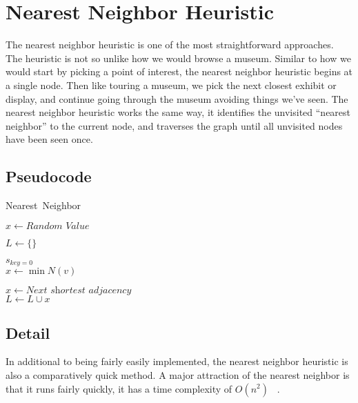 \documentclass{article}
\begin{document}
\section{Nearest Neighbor Heuristic}

The nearest neighbor heuristic is one of the most straightforward approaches.
The heuristic is not so unlike how we would browse a museum. Similar to how we
would start by picking a point of interest, the nearest neighbor heuristic
begins at a single node. Then like touring a museum, we pick the next closest
exhibit or display, and continue going through the museum avoiding things we’ve
seen. The nearest neighbor heuristic works the same way, it identifies the
unvisited “nearest neighbor” to the current node, and traverses the graph until
all unvisited nodes have been seen once.

\subsection{Pseudocode}

\FloatBarrier

\begin{algorithm}
  \caption{Nearest\ Neighbor}
  \label{alg1}
  \begin{algorithmic}[1]

    \State $x \gets \textit{Random\ Value}$

    \State $L \gets \{\}$

    \State $s_{\textit{key} = 0}$
    \\
        \State $x \gets \min N(v)$

        \Else
          \State $x \gets \textit{Next shortest adjacency}$
        \EndIf
      \EndFor
    \EndWhile
    \\
    \State $L \gets L \cup {x}$
    \EndProcedure
  \end{algorithmic}
\end{algorithm}

\FloatBarrier

\subsection{Detail}
In additional to being fairly easily implemented, the nearest neighbor heuristic
is also a comparatively quick method. A major attraction of the nearest neighbor
is that it runs fairly quickly, it has a time complexity of $O(n^2)$
~\cite{nilsson2003heuristics}.\\
\end{document}
